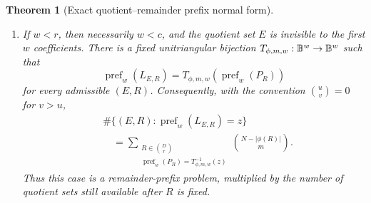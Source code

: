 \documentclass[11pt,a4paper]{amsart}
\numberwithin{equation}{section}
\newtheorem{theorem}{Theorem}[section]
\theoremstyle{remark}
\begin{document}
\begin{theorem}[Exact quotient--remainder prefix normal form]
\begin{enumerate}[label=\textup{(\roman*)},leftmargin=*]
\item If $w<r$, then necessarily $w<c$, and the quotient set $E$ is
      invisible to the first $w$ coefficients.  There is a fixed
      unitriangular bijection $T_{\phi,m,w}:\mathbb B^w\to\mathbb B^w$ such that
      \[
          \operatorname{pref}_w(L_{E,R})
          =T_{\phi,m,w}(\operatorname{pref}_w(P_R))                 \tag{QR3}
      \]
      for every admissible $(E,R)$.  Consequently, with the convention
      \(\binom uv=0\) for $v>u$,
      \[
      \begin{split}
       &\#\{(E,R):\operatorname{pref}_w(L_{E,R})=z\}\\
       &\quad=
       \sum_{\substack{R\in\binom Dr\\
          \operatorname{pref}_w(P_R)=T_{\phi,m,w}^{-1}(z)}}
          \binom{N-|\phi(R)|}{m}.
      \end{split}                                  \tag{QR4}\label{eq:qr-shallow-remainder}
      \]
      Thus this case is a remainder-prefix problem, multiplied by the
      number of quotient sets still available after $R$ is fixed.
\end{enumerate}
\end{theorem}
\end{document}
